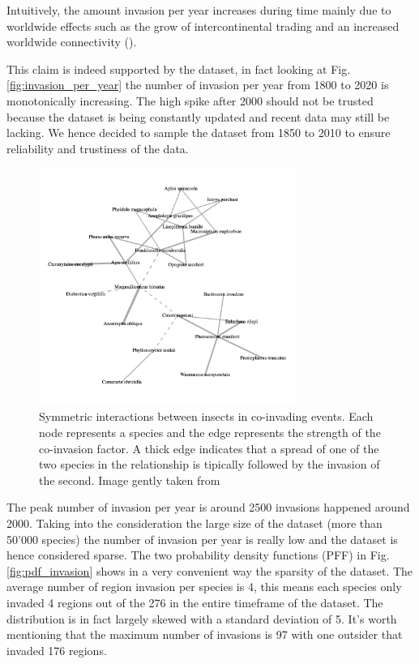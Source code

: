 \documentclass[mscthesis]{usiinfthesis}
\begin{document}
Intuitively, the amount invasion per year increases during time mainly due to worldwide effects such as the grow of intercontinental trading and an increased worldwide connectivity (\cite{intro:ecological}). 

This claim is indeed supported by the dataset, in fact looking at Fig. \ref{fig:invasion_per_year} the number of invasion per year from 1800 to 2020 is monotonically increasing. The high spike after 2000 should not be trusted because the dataset is being constantly updated and recent data may still be lacking. We hence decided to sample the dataset from 1850 to 2010 to ensure reliability and trustiness of the data.

\begin{figure}[H]
    \centering
    \includegraphics[width=0.75\textwidth]{coinvasion.png}
    \caption{Symmetric interactions between insects in co-invading events. Each node represents a species and the edge represents the strength of the co-invasion factor. A thick edge indicates that a spread of one of the two species in the relationship is tipically followed by the invasion of the second. Image gently taken from \cite{intro:ecological}}
    \label{fig:hist_tax_fam}
\end{figure}

The peak number of invasion per year is around 2500 invasions happened around 2000. Taking into the consideration the large size of the dataset (more than 50'000 species) the number of invasion per year is really low and the dataset is hence considered sparse. The two probability density functions (PFF) in Fig. \ref{fig:pdf_invasion} shows in a very convenient way the sparsity of the dataset. The average number of region invasion per species is 4, this means each species only invaded 4 regions out of the 276 in the entire timeframe of the dataset. The distribution is in fact largely skewed with a standard deviation of 5. It's worth mentioning that the maximum number of invasions is 97 with one outsider that invaded 176 regions. 
\end{document}
